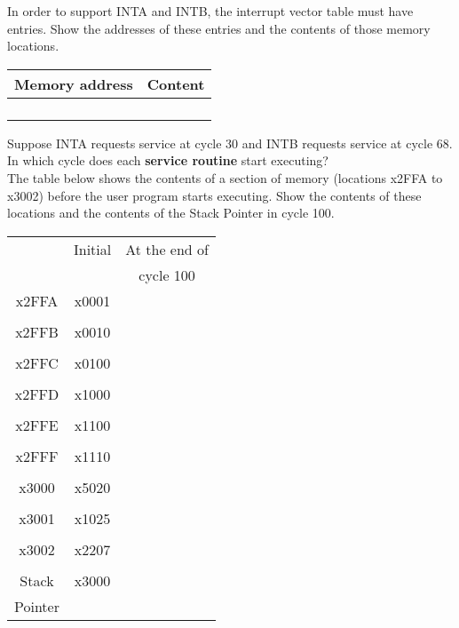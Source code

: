 \documentclass{patt}
\begin{document}
\begin{exercises}
\noindent
In order to support INTA and INTB, the interrupt vector table must have entries.  Show the addresses of these entries and the contents of those memory locations.
\begin{center}
\begin{tabular}{|p{3cm}|p{3cm}|}
\hline
 Memory address & Content \\ \hline \hline
 & \\
 & \\ \hline
 & \\
 & \\ \hline

\end{tabular}
\end{center}

\noindent
Suppose INTA requests service at cycle 30 and INTB requests service at cycle 68. In which cycle does each \textbf{service routine} start executing? \\

\noindent
The table below shows the contents of a section of memory (locations
x2FFA to x3002) before the user program starts executing.  Show the
contents of these locations and the contents of the Stack Pointer
in cycle 100. \\

\begin{center}
\begin{tabular}{c|c|c|}
\cline{2-3}
& { }{ }{ }{ }{ }Initial{ }{ }{ }{ }{ } & At the end of  \\
&         & cycle 100 \\
  \cline{2-3}
 x2FFA& x0001 &\\
 & &\\ \cline{2-3}
 x2FFB& x0010&\\
 & &\\ \cline{2-3}
 x2FFC& x0100&\\
 & &\\ \cline{2-3}
 x2FFD& x1000&\\
 & &\\ \cline{2-3}
 x2FFE& x1100&\\
 & &\\ \cline{2-3}
 x2FFF& x1110&\\
 & &\\ \cline{2-3}
 x3000& x5020&\\
 & &\\ \cline{2-3}
 x3001& x1025&\\
 & &\\ \cline{2-3}
 x3002& x2207&\\
 & &\\ \cline{2-3}
Stack& x3000 &\\
Pointer & &\\ \cline{2-3}
\end{tabular} 
\end{center}


\end{exercises}
\end{document}
